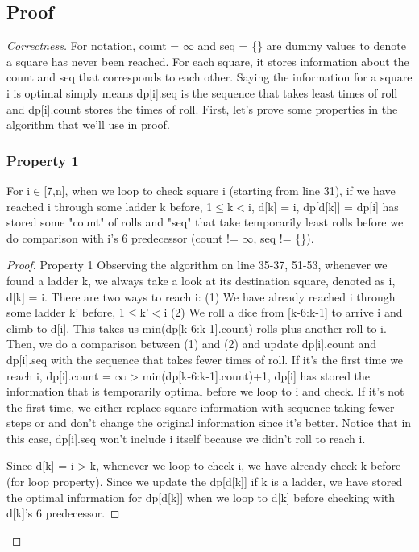 \documentclass[openany]{article}
\begin{document}
\subsection*{Proof}
\begin{proof}[Correctness]{}
    For notation, count = $\infty$ and seq = \{\} are dummy values to denote a square has never been reached. For each square, it stores information about the count and seq that corresponds to each other. Saying the information for a square i is optimal simply means dp[i].seq is the sequence that takes least times of roll and dp[i].count stores the times of roll. First, let's prove some properties in the algorithm that we'll use in proof.
\subsubsection*{Property 1}
    For i$\in$[7,n], when we loop to check square i (starting from line 31), if we have reached i through some ladder k before, 1$\leq$k$<$i, d[k] = i, dp[d[k]] = dp[i] has stored some "count" of rolls and "seq" that take temporarily least rolls before we do comparison with i's 6 predecessor (count != $\infty$, seq != \{\}).
    \begin{proof}{Property 1}
         Observing the algorithm on line 35-37, 51-53, whenever we found a ladder k, we always take a look at its destination square, denoted as i, d[k] = i. There are two ways to reach i: (1) We have already reached i through some ladder k' before, 1$\leq$k'$<$i (2) We roll a dice from [k-6:k-1] to arrive i and climb to d[i]. This takes us min(dp[k-6:k-1].count) rolls plus another roll to i. Then, we do a comparison between (1) and (2) and update dp[i].count and dp[i].seq with the sequence that takes fewer times of roll. If it's the first time we reach i, dp[i].count = $\infty$ > min(dp[k-6:k-1].count)+1, dp[i] has stored the information that is temporarily optimal before we loop to i and check. If it's not the first time, we either replace square information with sequence taking fewer steps or and don't change the original information since it's better. Notice that in this case, dp[i].seq won't include i itself because we didn't roll to reach i.
         
         Since d[k] = i > k, whenever we loop to check i, we have already check k before (for loop property). Since we update the dp[d[k]] if k is a ladder, we have stored the optimal information for dp[d[k]] when we loop to d[k] before checking with d[k]'s 6 predecessor.
    \end{proof}


\end{proof}
\end{document}
